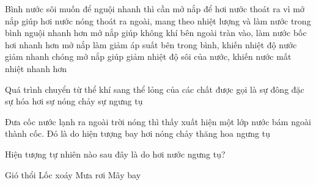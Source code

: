 \begin{ex}
	Bình nước sôi muốn để nguội nhanh thì cần mở nắp để hơi nước thoát ra vì
	\choice
	{\True mở nắp giúp hơi nước nóng thoát ra ngoài, mang theo nhiệt lượng và làm nước trong bình nguội nhanh hơn}
	{mở nắp giúp không khí bên ngoài tràn vào, làm nước bốc hơi nhanh hơn}
	{mở nắp làm giảm áp suất bên trong bình, khiến nhiệt độ nước giảm nhanh chóng}
	{mở nắp giúp giảm nhiệt độ sôi của nước, khiến nước mất nhiệt nhanh hơn}
	\end{ex}
\begin{ex} 
	Quá trình chuyển từ thể khí sang thể lỏng của các chất được gọi là
	\choice
	{sự đông đặc}
	{sự hóa hơi}
	{sự nóng chảy}
	{\True sự ngưng tụ}
\end{ex}
\begin{ex}
	Đưa cốc nước lạnh ra ngoài trời nóng thì thấy xuất hiện một lớp nước bám ngoài thành cốc. Đó là do hiện tượng
	\choice
	{bay hơi}
	{nóng chảy}
	{thăng hoa}
	{\True ngưng tụ}
\end{ex}
\begin{ex}
	Hiện tượng tự nhiên nào sau đây là do hơi nước ngưng tụ?
	
	\choice
	{Gió thổi}
	{Lốc xoáy}
	{\True Mưa rơi}
	{Mây bay}
	\end{ex}

